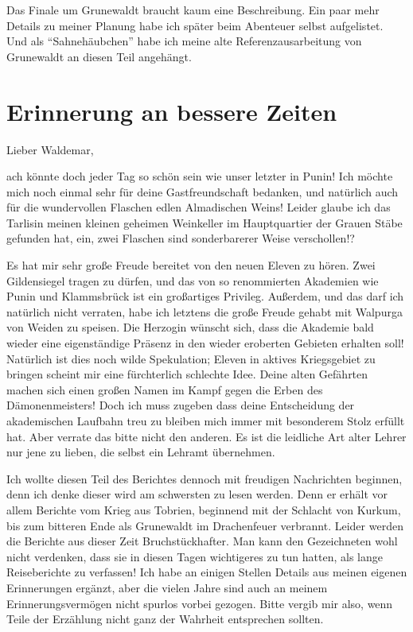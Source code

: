Das Finale um Grunewaldt braucht kaum eine Beschreibung. Ein paar mehr Details zu meiner Planung habe ich später beim Abenteuer selbst aufgelistet.
Und als ``Sahnehäubchen'' habe ich meine alte Referenzausarbeitung von Grunewaldt an diesen Teil angehängt.


\chapter{Erinnerung an bessere Zeiten}
Lieber Waldemar,

ach könnte doch jeder Tag so schön sein wie unser letzter in Punin!
Ich möchte mich noch einmal sehr für deine Gastfreundschaft bedanken, und natürlich auch für die wundervollen Flaschen edlen Almadischen Weins!
Leider glaube ich das Tarlisin meinen kleinen geheimen Weinkeller im Hauptquartier der Grauen Stäbe gefunden hat, ein, zwei Flaschen sind sonderbarerer Weise verschollen!?

Es hat mir sehr große Freude bereitet von den neuen Eleven zu hören. Zwei Gildensiegel tragen zu dürfen, und das von so renommierten Akademien wie Punin und Klammsbrück ist ein großartiges Privileg. Außerdem, und das darf ich natürlich nicht verraten, habe ich letztens die große Freude gehabt mit Walpurga von Weiden zu speisen. Die Herzogin wünscht sich, dass die Akademie bald wieder eine eigenständige Präsenz in den wieder eroberten Gebieten erhalten soll!
Natürlich ist dies noch wilde Spekulation; Eleven in aktives Kriegsgebiet zu bringen scheint mir eine fürchterlich schlechte Idee.
Deine alten Gefährten machen sich einen großen Namen im Kampf gegen die Erben des Dämonenmeisters! Doch ich muss zugeben dass deine Entscheidung der akademischen Laufbahn treu zu bleiben mich immer mit besonderem Stolz erfüllt hat. Aber verrate das bitte nicht den anderen. Es ist die leidliche Art alter Lehrer nur jene zu lieben, die selbst ein Lehramt übernehmen.

Ich wollte diesen Teil des Berichtes dennoch mit freudigen Nachrichten beginnen, denn ich denke dieser wird am schwersten zu lesen werden. Denn er erhält vor allem Berichte vom Krieg aus Tobrien, beginnend mit der Schlacht von Kurkum, bis zum bitteren Ende als Grunewaldt im Drachenfeuer verbrannt.
Leider werden die Berichte aus dieser Zeit Bruchstückhafter. Man kann den Gezeichneten wohl nicht verdenken, dass sie in diesen Tagen wichtigeres zu tun hatten, als lange Reiseberichte zu verfassen!
Ich habe an einigen Stellen Details aus meinen eigenen Erinnerungen ergänzt, aber die vielen Jahre sind auch an meinem Erinnerungsvermögen nicht spurlos vorbei gezogen.
Bitte vergib mir also, wenn Teile der Erzählung nicht ganz der Wahrheit entsprechen sollten.

